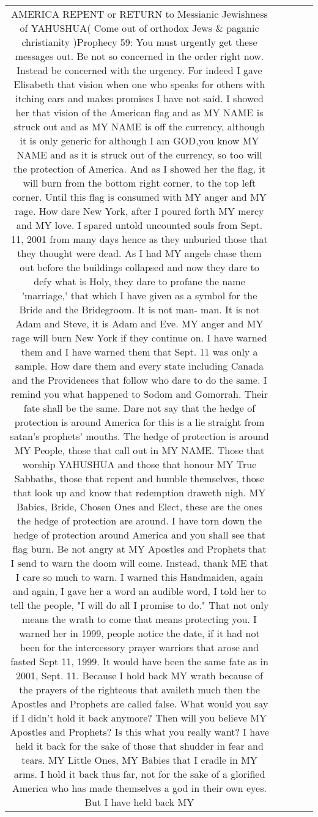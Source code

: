 \documentclass[11pt]{article}
\newlength\mylength
\begin{document}
\begin{center}
\begin{longtable}{|C{.65\mylength}|C{.30\mylength}|C{.12\mylength}|C{.12\mylength}|C{.12\mylength}|}
  \small AMERICA REPENT or RETURN to Messianic Jewishness of YAHUSHUA( Come out of orthodox Jews \& paganic christianity )Prophecy 59: You must urgently get these messages out. Be not so concerned in the order right now. Instead be concerned with the urgency. For indeed I gave Elisabeth that vision when one who speaks for others with itching ears and makes promises I have not said. I showed her that vision of the American flag and as MY NAME is struck out and as MY NAME is off the currency, although it is only generic for although I am GOD,you know MY NAME and as it is struck out of the currency, so too will the protection of America. And as I showed her the flag, it will burn from the bottom right corner, to the top left corner. Until this flag is consumed with MY anger and MY rage. How dare New York, after I poured forth MY mercy and MY love. I spared untold uncounted souls from Sept. 11, 2001 from many days hence as they unburied those that they thought were dead. As I had MY angels chase them out before the buildings collapsed and now they dare to defy what is Holy, they dare to profane the name 'marriage,' that which I have given as a symbol for the Bride and the Bridegroom. It is not man- man. It is not Adam and Steve, it is Adam and Eve. MY anger and MY rage will burn New York if they continue on. I have warned them and I have warned them that Sept. 11 was only a sample. How dare them and every state including Canada and the Providences that follow who dare to do the same. I remind you what happened to Sodom and Gomorrah. Their fate shall be the same. Dare not say that the hedge of protection is around America for this is a lie straight from satan's prophets' mouths. The hedge of protection is around MY People, those that call out in MY NAME. Those that worship YAHUSHUA and those that honour MY True Sabbaths, those that repent and humble themselves, those that look up and know that redemption draweth nigh. MY Babies, Bride, Chosen Ones and Elect, these are the ones the hedge of protection are around. I have torn down the hedge of protection around America and you shall see that flag burn. Be not angry at MY Apostles and Prophets that I send to warn the doom will come. Instead, thank ME that I care so much to warn. I warned this Handmaiden, again and again, I gave her a word an audible word, I told her to tell the people, "I will do all I promise to do." That not only means the wrath to come that means protecting you. I warned her in 1999, people notice the date, if it had not been for the intercessory prayer warriors that arose and fasted Sept 11, 1999. It would have been the same fate as in 2001, Sept. 11. Because I hold back MY wrath because of the prayers of the righteous that availeth much then the Apostles and Prophets are called false. What would you say if I didn't hold it back anymore? Then will you believe MY Apostles and Prophets? Is this what you really want? I have held it back for the sake of those that shudder in fear and tears. MY Little Ones, MY Babies that I cradle in MY arms. I hold it back thus far, not for the sake of a glorified America who has made themselves a god in their own eyes. But I have held back MY 
\end{longtable}
\end{center}
\end{document}
